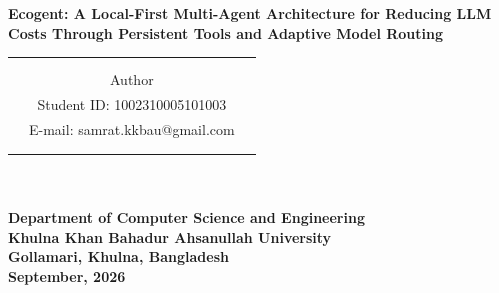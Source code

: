 \begin{center}
\Large \textbf{Ecogent: A Local-First Multi-Agent Architecture for Reducing LLM Costs Through Persistent Tools and Adaptive Model Routing\\}
\normalsize
\vspace{112pt}

\begin{tabular}{ccc}

\hline\noalign{\smallskip}

&&\\
&&\\
&Author&\\
&Student ID: 1002310005101003&\\
&E-mail: samrat.kkbau@gmail.com&\\
&&\\

\noalign{\smallskip}\hline
\end{tabular}\\


\vspace{144pt}
\hspace{5cm} \makebox[6in]{\hrulefill}\\
\large
\textbf{Department of Computer Science and Engineering}\\
\textbf{Khulna Khan Bahadur Ahsanullah University} \\
\textbf{Gollamari, Khulna, Bangladesh}\\
\vspace{24pt}
\textbf{September, 2026}
\end{center}
